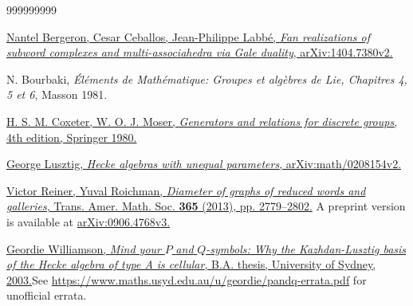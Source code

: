 \documentclass[numbers=enddot,12pt,final,onecolumn,notitlepage,abstracton]{scrartcl}%
\theoremstyle{definition}
\begin{document}
\begin{thebibliography}{999999999}                                                                                        %


\href{http://arxiv.org/abs/1404.7380v2}{Nantel
Bergeron, Cesar Ceballos, Jean-Philippe Labb\'{e}, \textit{Fan realizations of
subword complexes and multi-associahedra via Gale duality},
arXiv:1404.7380v2.}

N. Bourbaki, \textit{\'{E}l\'{e}ments de
Math\'{e}matique: Groupes et alg\`{e}bres de Lie, Chapitres 4, 5 et 6}, Masson 1981.

%
\href{https://doi.org/10.1007/978-3-662-21943-0}{H. S. M. Coxeter, W. O. J.
Moser, \textit{Generators and relations for discrete groups}, 4th edition,
Springer 1980.}

%
\href{http://arxiv.org/abs/math/0208154v2}{George Lusztig, \textit{Hecke
algebras with unequal parameters}, arXiv:math/0208154v2.}

%
\href{http://www.ams.org/journals/tran/2013-365-05/S0002-9947-2012-05719-9/S0002-9947-2012-05719-9.pdf}{Victor
Reiner, Yuval Roichman, \textit{Diameter of graphs of reduced words and
galleries}, Trans. Amer. Math. Soc. \textbf{365} (2013), pp. 2779--2802.}%
\newline A preprint version is available at
\href{http://arxiv.org/abs/0906.4768v3}{arXiv:0906.4768v3.}

%
\href{https://web.archive.org/web/20250801094939/https://people.mpim-bonn.mpg.de/geordie/Hecke.pdf}{Geordie
Williamson, \textit{Mind your }$P$\textit{ and }$Q$\textit{-symbols: Why the
Kazhdan-Lusztig basis of the Hecke algebra of type A is cellular}, B.A.
thesis, University of Sydney, 2003.}\newline See
\url{https://www.maths.usyd.edu.au/u/geordie/pandq-errata.pdf} for unofficial errata.
\end{thebibliography}
\end{document}
